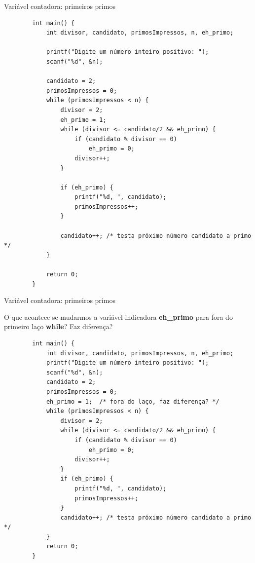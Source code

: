 \documentclass[handout]{beamer}
\begin{document}
\begin{frame}[fragile]{Variável contadora: primeiros primos}

    \begin{verbatim}
        int main() {
            int divisor, candidato, primosImpressos, n, eh_primo;

            printf("Digite um número inteiro positivo: ");
            scanf("%d", &n);

            candidato = 2;
            primosImpressos = 0;
            while (primosImpressos < n) {
                divisor = 2;
                eh_primo = 1;
                while (divisor <= candidato/2 && eh_primo) {
                    if (candidato % divisor == 0)
                        eh_primo = 0;
                    divisor++;
                }

                if (eh_primo) {
                    printf("%d, ", candidato);
                    primosImpressos++;
                }

                candidato++; /* testa próximo número candidato a primo */
            }

            return 0;
        }
    \end{verbatim}
\end{frame}

\begin{frame}[fragile]{Variável contadora: primeiros primos}

    \small
    O que acontece se mudarmos a variável indicadora {\bf eh\_primo} para fora do primeiro laço {\bf while}? Faz diferença?
    
    \begin{verbatim}
        int main() {
            int divisor, candidato, primosImpressos, n, eh_primo;
            printf("Digite um número inteiro positivo: ");
            scanf("%d", &n);
            candidato = 2;
            primosImpressos = 0;
            eh_primo = 1;  /* fora do laço, faz diferença? */
            while (primosImpressos < n) {
                divisor = 2;
                while (divisor <= candidato/2 && eh_primo) {
                    if (candidato % divisor == 0)
                        eh_primo = 0;
                    divisor++;
                }
                if (eh_primo) {
                    printf("%d, ", candidato);
                    primosImpressos++;
                }
                candidato++; /* testa próximo número candidato a primo */
            }
            return 0;
        }
    \end{verbatim}
\end{frame}
\end{document}
